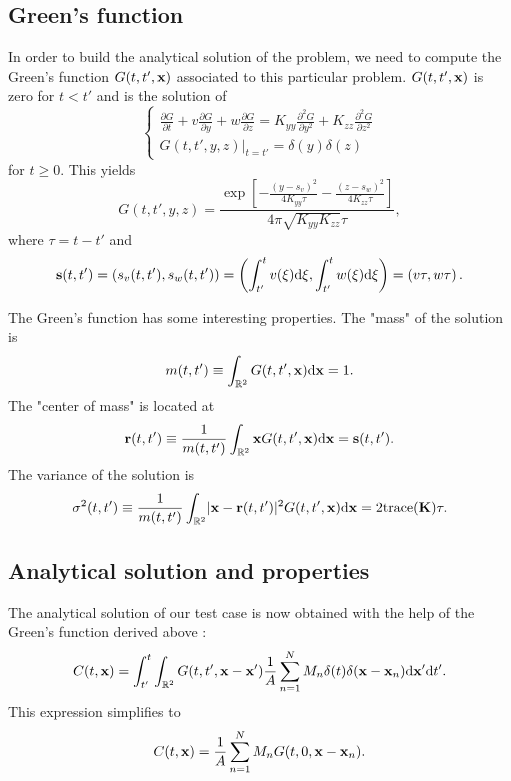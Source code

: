 \subsection*{Green's function}
In order to build the analytical solution of the problem, we need to compute the Green's function $\G$ associated to this particular problem. $\G$ is zero for $t<t'$ and is the solution of
\begin{equation}
	\begin{cases}
		\frac{\partial G}{\partial t} + v \frac{\partial G}{\partial y} + w\frac{\partial G}{\partial z} = K_{yy}\frac{\partial^2 G}{\partial y^2} + K_{zz}\frac{\partial^2 G}{\partial z^2}\\[.1cm]
		\left. G(t,t',y,z) \right \rvert_{t=t'} = \delta(y)\delta(z) 
	\end{cases}
\end{equation}
for $t \ge 0$. This yields
\begin{equation} 
	G(t,t',y,z) = \frac{\exp\left[-\frac{(y-s_v)^2}{4K_{yy}\tau} -\frac{(z-s_w)^2}{4K_{zz}\tau} \right]}{4\pi\sqrt{K_{yy}K_{zz}}\tau},
\end{equation}
where $\tau = t-t'$ and 
\begin{equation}
	\b s(t,t') = (s_v(t,t'), s_w(t,t')) = \left(\int_{t'}^{t}v(\xi) \rm d \xi, \int_{t'}^{t}w(\xi) \rm d \xi \right) = \left(v\tau, w\tau\right).
\end{equation}

The Green's function has some interesting properties. The "mass" of the solution is
\begin{equation} \label{eq:testcase:propmass}
	m(t,t') \equiv \int_{\R[2]} \G \rm d \b x = 1.
\end{equation}
The "center of mass" is located at
\begin{equation} \label{eq:testcase:propcenter}
	\b r(t,t') \equiv \frac{1}{m(t,t')} \int_{\R[2]} \b x \G \rm d \b x  = \b s(t,t').
\end{equation}
The variance of the solution is
\begin{equation} \label{eq:testcase:propvar}
	\sigma^2(t,t') \equiv \frac{1}{m(t,t')} \int_{\R[2]} \lvert \b x - \b r(t,t') \rvert^2 \G \rm d \b x = 2 \rm{trace}(\b K) \tau.
\end{equation}

\subsection*{Analytical solution and properties}
The analytical solution of our test case is now obtained with the help of the Green's function derived above :
\begin{equation}
	C(t,\b x) = \int_{t'}^{t} \int_{\R[2]} G(t,t',\b x - \b x') \frac{1}{A} \sum_{n=1}^{N} M_n \delta(t) \delta(\b x- \b x_n) \rm d \b{x}' \rm dt'.
\end{equation}
This expression simplifies to
\begin{equation}
	C(t,\b x) = \frac{1}{A} \sum_{n=1}^{N} M_n G(t,0,\b x - \b x_n).
\end{equation}

